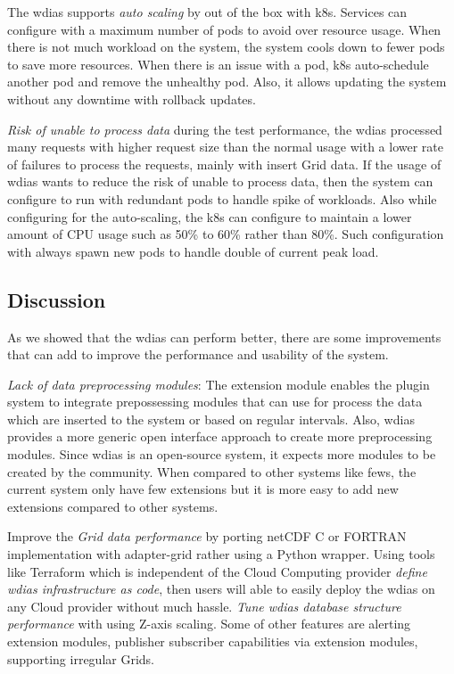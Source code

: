 \documentclass[conference]{IEEEtran}
\begin{document}
The \acrshort{wdias} supports \emph{auto scaling} by out of the box with \acrshort{k8s}. Services can configure with a maximum number of pods to avoid over resource usage. When there is not much workload on the system, the system cools down to fewer pods to save more resources. When there is an issue with a pod, \acrshort{k8s} auto-schedule another pod and remove the unhealthy pod. Also, it allows updating the system without any downtime with rollback updates.

\emph{Risk of unable to process data} during the test performance, the \acrshort{wdias} processed many requests with higher request size than the normal usage with a lower rate of failures to process the requests, mainly with insert Grid data. If the usage of \acrshort{wdias} wants to reduce the risk of unable to process data, then the system can configure to run with redundant pods to handle spike of workloads. Also while configuring for the auto-scaling, the \acrshort{k8s} can configure to maintain a lower amount of CPU usage such as 50\% to 60\% rather than 80\%. Such configuration with always spawn new pods to handle double of current peak load.

\subsection{Discussion}
\label{psubse:discussion}

As we showed that the \acrshort{wdias} can perform better, there are some improvements that can add to improve the performance and usability of the system.

\emph{Lack of data preprocessing modules}:
The extension module enables the plugin system to integrate prepossessing modules that can use for process the data which are inserted to the system or based on regular intervals. Also, \acrshort{wdias} provides a more generic open interface approach to create more preprocessing modules. Since \acrshort{wdias} is an open-source system, it expects more modules to be created by the community. When compared to other systems like \acrshort{fews}, the current system only have few extensions but it is more easy to add new extensions compared to other systems.

Improve the \emph{Grid data performance} by porting \acrshort{netCDF} C or FORTRAN implementation with adapter-grid rather using a Python wrapper. Using tools like Terraform which is independent of the Cloud Computing provider \emph{define \acrshort{wdias} infrastructure as code}, then users will able to easily deploy the \acrshort{wdias} on any Cloud provider without much hassle. \emph{Tune \acrshort{wdias} database structure performance} with using Z-axis scaling. Some of other features are alerting extension modules, publisher subscriber capabilities via extension modules, supporting irregular Grids.
\end{document}
